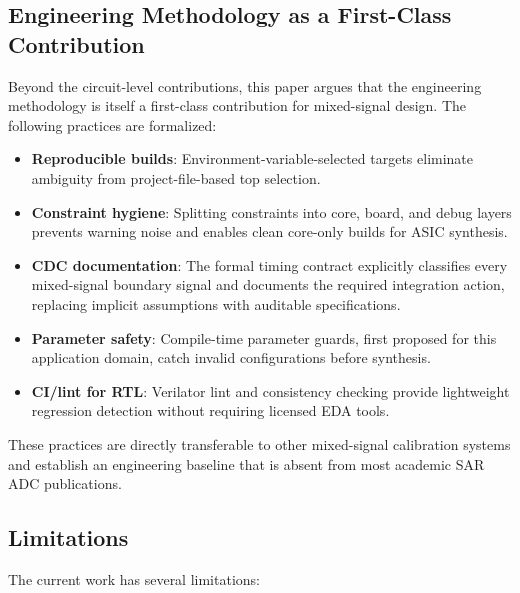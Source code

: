 \documentclass[journal]{IEEEtran}
\begin{document}
\subsection{Engineering Methodology as a First-Class Contribution}

Beyond the circuit-level contributions, this paper argues that the engineering
methodology is itself a first-class contribution for mixed-signal design. The
following practices are formalized:

\begin{itemize}
    \item \textbf{Reproducible builds}: Environment-variable-selected targets
          eliminate ambiguity from project-file-based top selection.
    \item \textbf{Constraint hygiene}: Splitting constraints into core, board,
          and debug layers prevents warning noise and enables clean core-only
          builds for ASIC synthesis.
    \item \textbf{CDC documentation}: The formal timing contract explicitly
          classifies every mixed-signal boundary signal and documents the
          required integration action, replacing implicit assumptions with
          auditable specifications.
    \item \textbf{Parameter safety}: Compile-time parameter guards, first
          proposed for this application domain, catch invalid configurations
          before synthesis.
    \item \textbf{CI/lint for RTL}: Verilator lint and consistency checking
          provide lightweight regression detection without requiring licensed
          EDA tools.
\end{itemize}

These practices are directly transferable to other mixed-signal calibration
systems and establish an engineering baseline that is absent from most
academic SAR ADC publications.

\subsection{Limitations}

The current work has several limitations:
\end{document}
